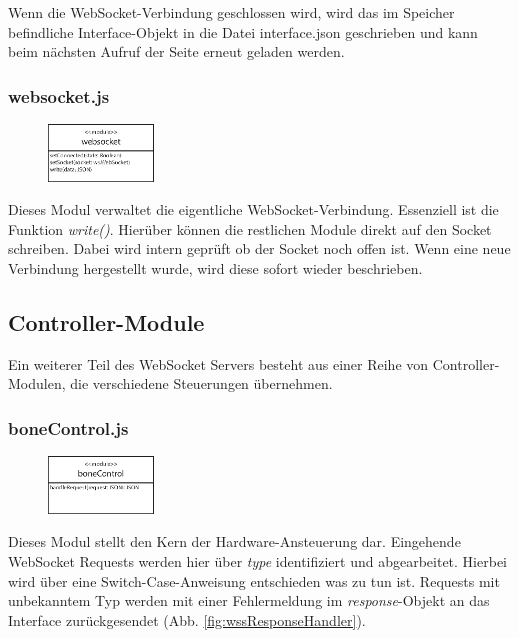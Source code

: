 Wenn die WebSocket-Verbindung geschlossen wird, wird das im Speicher befindliche Interface-Objekt in die Datei interface.json geschrieben und kann beim nächsten Aufruf der Seite erneut geladen werden.

\subsubsection{websocket.js}
\begin{figure}
  \vspace{-18pt}
  \centering
  \includegraphics[width = 0.25\textwidth]{documentation/images/apiWebsocket.eps}
\end{figure}

Dieses Modul verwaltet die eigentliche WebSocket-Verbindung. Essenziell ist die Funktion \textit{write()}. Hierüber können die restlichen Module direkt auf den Socket schreiben. Dabei wird intern geprüft ob der Socket noch offen ist. Wenn eine neue Verbindung hergestellt wurde, wird diese sofort wieder beschrieben.


\subsection{Controller-Module}
Ein weiterer Teil des WebSocket Servers besteht aus einer Reihe von Controller-Modulen, die verschiedene Steuerungen übernehmen.

\subsubsection{boneControl.js}
\begin{figure}
  \vspace{-18pt}
  \centering
  \includegraphics[width = 0.25\textwidth]{documentation/images/apiBoneControl.eps}
\end{figure}

Dieses Modul stellt den Kern der Hardware-Ansteuerung dar. Eingehende WebSocket Requests werden hier über \textit{type} identifiziert und abgearbeitet. Hierbei wird über eine Switch-Case-Anweisung entschieden was zu tun ist. Requests mit unbekanntem Typ werden mit einer Fehlermeldung im \textit{response}-Objekt an das Interface zurückgesendet (Abb. \ref{fig:wssResponseHandler}).

